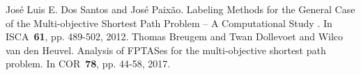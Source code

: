 \documentclass[oneside, 10pt, twocolumn]{jarticle}
\begin{document}
%
%
%
%
%
%
%
%

\begin{thebibliography}{9} %
   José Luis E. Dos Santos and José Paixão.
   Labeling Methods for the General Case of the Multi-objective
   Shortest Path Problem – A Computational Study
   . In ISCA~\textbf{61}, pp. 489-502,
   2012.
    Thomas Breugem and Twan Dollevoet and Wilco van den Heuvel.
    Analysis of FPTASes for the multi-objective shortest path problem.
    In COR~\textbf{78}, pp. 44-58,
    2017.

\end{thebibliography}
\end{document}

